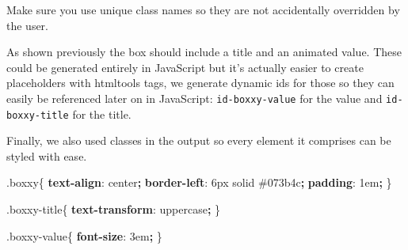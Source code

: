 \documentclass[
]{krantz}
\makeatletter
\newenvironment{Shaded}{\begin{snugshade}}{\end{snugshade}}
\newcommand{\CommentTok}[1]{\textcolor[rgb]{0.37,0.37,0.37}{\textit{#1}}}
\newcommand{\ConstantTok}[1]{\textcolor[rgb]{0,0,0}{#1}}
\newcommand{\ControlFlowTok}[1]{\textcolor[rgb]{0.27,0.27,0.27}{\textbf{#1}}}
\newcommand{\DataTypeTok}[1]{\textcolor[rgb]{0.27,0.27,0.27}{#1}}
\newcommand{\DecValTok}[1]{\textcolor[rgb]{0.06,0.06,0.06}{#1}}
\newcommand{\FunctionTok}[1]{\textcolor[rgb]{0,0,0}{#1}}
\newcommand{\KeywordTok}[1]{\textcolor[rgb]{0.27,0.27,0.27}{\textbf{#1}}}
\newcommand{\NormalTok}[1]{#1}
\newcommand{\OperatorTok}[1]{\textcolor[rgb]{0.43,0.43,0.43}{\textbf{#1}}}
\newcommand{\StringTok}[1]{\textcolor[rgb]{0.5,0.5,0.5}{#1}}
\newenvironment{kframe}{%
\medskip{}
\setlength{\fboxsep}{.8em}
 \def\at@end@of@kframe{}%
 \ifinner\ifhmode%
  \def\at@end@of@kframe{\end{minipage}}%
  \begin{minipage}{\columnwidth}%
 \fi\fi%
 \def\FrameCommand##1{\hskip\@totalleftmargin \hskip-\fboxsep
 \colorbox{shadecolor}{##1}\hskip-\fboxsep
     \hskip-\linewidth \hskip-\@totalleftmargin \hskip\columnwidth}%
 \MakeFramed {\advance\hsize-\width
   \@totalleftmargin\z@ \linewidth\hsize
   \@setminipage}}%
 {\par\unskip\endMakeFramed%
 \at@end@of@kframe}
\renewenvironment{Shaded}{\begin{kframe}}{\end{kframe}}
\newenvironment{rmdblock}[1]
  {
  \begin{itemize}
  \renewcommand{\labelitemi}{
    \raisebox{-.7\height}[0pt][0pt]{
      {\setkeys{Gin}{width=3em,keepaspectratio}\texttt{[image: images/\#1]}}
    }
  }
  \setlength{\fboxsep}{1em}
  \begin{kframe}
  \item
  }
  {
  \end{kframe}
  \end{itemize}
  }
\newenvironment{rmdnote}
  {\begin{rmdblock}{note}}
  {\end{rmdblock}}
\makeatother
\begin{document}
\begin{rmdnote}
Make sure you use unique class names so they are not accidentally
overridden by the user.
\end{rmdnote}

As shown previously the box should include a title and an animated value. These could be generated entirely in JavaScript but it's actually easier to create placeholders with htmltools tags, we generate dynamic ids for those so they can easily be referenced later on in JavaScript: \texttt{id-boxxy-value} for the value and \texttt{id-boxxy-title} for the title.

\begin{Shaded}
\end{Shaded}

Finally, we also used classes in the output so every element it comprises can be styled with ease.

\begin{Shaded}
\begin{Highlighting}[]
\FunctionTok{.boxxy}\NormalTok{\{}
  \KeywordTok{text{-}align}\NormalTok{: }\DecValTok{center}\OperatorTok{;}
  \KeywordTok{border{-}left}\NormalTok{: }\DecValTok{6}\DataTypeTok{px} \DecValTok{solid} \ConstantTok{\#073b4c}\OperatorTok{;}
  \KeywordTok{padding}\NormalTok{: }\DecValTok{1}\DataTypeTok{em}\OperatorTok{;}
\NormalTok{\}}

\FunctionTok{.boxxy{-}title}\NormalTok{\{}
  \KeywordTok{text{-}transform}\NormalTok{: }\DecValTok{uppercase}\OperatorTok{;}
\NormalTok{\}}

\FunctionTok{.boxxy{-}value}\NormalTok{\{}
  \KeywordTok{font{-}size}\NormalTok{: }\DecValTok{3}\DataTypeTok{em}\OperatorTok{;}
\NormalTok{\}}
\end{Highlighting}
\end{Shaded}
\end{document}

